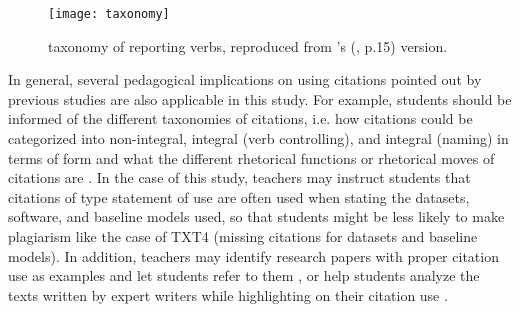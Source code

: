 \begin{figure}[htb]
    \centering
    \texttt{[image: taxonomy]}
    \caption[ taxonomy of reporting verbs]{ taxonomy of reporting verbs, reproduced from \citeauthor{peng_authorial_2019}’s (\citeyear{peng_authorial_2019},  p.15) version.}
    \label{fig:taxonomy}
  \end{figure}

In general, several pedagogical implications on using citations pointed out by previous studies are also applicable in this study. For example, students should be informed of the different taxonomies of citations, i.e. how citations could be categorized into non-integral, integral (verb controlling), and integral (naming) in terms of form and what the different rhetorical functions or rhetorical moves of citations are \citep{kwan_investigation_2014,mansourizadeh_citation_2011}. In the case of this study, teachers may instruct students that citations of type statement of use are often used when stating the datasets, software, and baseline models used, so that students might be less likely to make plagiarism like the case of TXT4 (missing citations for datasets and baseline models). In addition, teachers may identify research papers with proper citation use as examples and let students refer to them \cite{petric_task_2013,ridley_tracking_2006}, or help students analyze the texts written by expert writers while highlighting on their citation use \cite{mansourizadeh_citation_2011}.